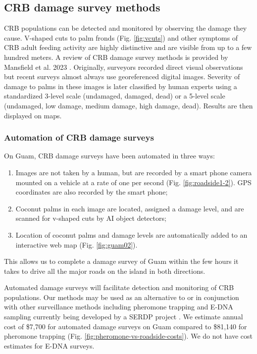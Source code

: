 \documentclass[11pt,english,letterpaper]{scrartcl}
\begin{document}
\subsection{CRB damage survey methods}

CRB populations can be detected and monitored by observing the damage they cause. V-shaped cuts to palm fronds (Fig. \ref{fig:vcuts}) and other symptoms of CRB adult feeding activity are highly distinctive and are visible from up to a few hundred meters. A review of CRB damage survey methods is provided by Mansfield et al. 2023 \cite{Mansfield2023}. Originally, surveyors recorded direct visual observations but recent surveys almost always use georeferenced digital images. Severity of damage to palms in these images is later classified by human experts using a standardized 3-level scale (undamaged, damaged, dead) or a 5-level scale (undamaged, low damage, medium damage, high damage, dead). Results are then displayed on maps.

\subsubsection{Automation of CRB damage surveys}

On Guam, CRB damage surveys have been automated in three ways:

\begin{enumerate}
	\item Images are not taken by a human, but are recorded by a smart phone camera mounted on a vehicle at a rate of one per second (Fig. \ref{fig:roadside1-2}). GPS coordinates are also recorded by the smart phone;
	\item Coconut palms in each image are located, assigned a damage level, and are scanned for v-shaped cuts by AI object detectors;
	\item Location of coconut palms and damage levels are automatically added to an interactive web map (Fig. \ref{fig:guam02}).
\end{enumerate}

This allows us to complete a damage survey of Guam within the few hours it takes to drive all the major roads on the island in both directions.

Automated damage surveys will facilitate detection and monitoring of CRB populations. Our methods may be used as an alternative to or in conjunction with other surveillance methods including pheromone trapping \cite{Paudel2023a} and E-DNA sampling currently being developed by a SERDP project \cite{SERDP2021}. We estimate annual cost of \$7,700 for automated damage surveys on Guam compared to \$81,140 for pheromone trapping (Fig. \ref{fig:pheromone-vs-roadside-costs}). We do not have cost estimates for E-DNA surveys.
\end{document}
